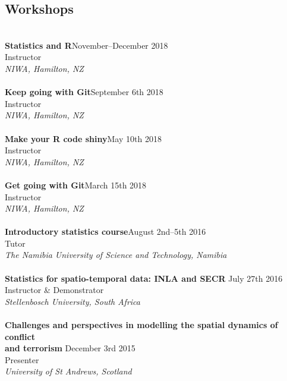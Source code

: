 \documentclass[10pt,letter]{article}
\begin{document}
\subsection*{Workshops}
\vspace{1mm}
 \hdashrule[0.5ex]{4cm}{1pt}{1pt}\\
{\textbf{Statistics and R}}\hfill November--December 2018\\
Instructor \\
 {\sl NIWA, Hamilton, NZ}\\
 \hdashrule[0.5ex]{4cm}{1pt}{1pt}\\
{\textbf{Keep going with Git}}\hfill September 6th 2018\\
Instructor \\
 {\sl NIWA, Hamilton, NZ}\\
 \hdashrule[0.5ex]{4cm}{1pt}{1pt}\\
{\textbf{Make your R code shiny}}\hfill May 10th 2018\\
Instructor \\
 {\sl NIWA, Hamilton, NZ}\\
 \hdashrule[0.5ex]{4cm}{1pt}{1pt}\\
{\textbf{Get going with Git}}\hfill March 15th 2018\\
Instructor \\
 {\sl NIWA, Hamilton, NZ}\\
 \hdashrule[0.5ex]{4cm}{1pt}{1pt}\\
{\textbf{Introductory statistics course}}\hfill August 2nd--5th 2016\\
Tutor \\
 {\sl The Namibia University of Science and Technology, Namibia}\\
 \hdashrule[0.5ex]{4cm}{1pt}{1pt}\\
 {\textbf{{Statistics for spatio-temporal data: INLA and SECR }}} \hfill July 27th 2016\\
 Instructor \& Demonstrator\\
 {\sl Stellenbosch University, South Africa}\\
 \hdashrule[0.5ex]{4cm}{1pt}{1pt}\\
 {\textbf{{Challenges and perspectives in modelling the spatial dynamics of conflict\\ and terrorism }}} \hfill December 3rd 2015\\
 Presenter\\
 {\sl University of St Andrews, Scotland}\\
 \hdashrule[0.5ex]{4cm}{1pt}{1pt}\\
\end{document}
